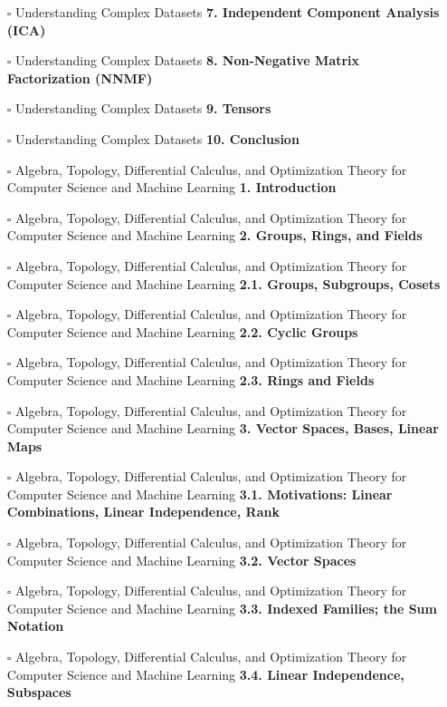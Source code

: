 \documentclass[a4, landscape, 12pt]{article}
\newcommand{\checkbox}{$\square$}%
\begin{document}
\begin{itemize}
{}
\item [\checkbox]  Understanding Complex Datasets \textbf{ 7. Independent Component Analysis (ICA)
}
\item [\checkbox]  Understanding Complex Datasets \textbf{ 8. Non-Negative Matrix Factorization (NNMF)
}
\item [\checkbox]  Understanding Complex Datasets \textbf{ 9. Tensors
}
\item [\checkbox]  Understanding Complex Datasets \textbf{ 10. Conclusion
}
\item [\checkbox]  Algebra, Topology, Differential Calculus, and Optimization Theory for Computer Science and Machine Learning \textbf{ 1. Introduction
}
\item [\checkbox]  Algebra, Topology, Differential Calculus, and Optimization Theory for Computer Science and Machine Learning \textbf{ 2. Groups, Rings, and Fields
}
\item [\checkbox]  Algebra, Topology, Differential Calculus, and Optimization Theory for Computer Science and Machine Learning \textbf{ 2.1. Groups, Subgroups, Cosets
}
\item [\checkbox]  Algebra, Topology, Differential Calculus, and Optimization Theory for Computer Science and Machine Learning \textbf{ 2.2. Cyclic Groups
}
\item [\checkbox]  Algebra, Topology, Differential Calculus, and Optimization Theory for Computer Science and Machine Learning \textbf{ 2.3. Rings and Fields
}
\item [\checkbox]  Algebra, Topology, Differential Calculus, and Optimization Theory for Computer Science and Machine Learning \textbf{ 3. Vector Spaces, Bases, Linear Maps
}
\item [\checkbox]  Algebra, Topology, Differential Calculus, and Optimization Theory for Computer Science and Machine Learning \textbf{ 3.1. Motivations: Linear Combinations, Linear Independence, Rank
}
\item [\checkbox]  Algebra, Topology, Differential Calculus, and Optimization Theory for Computer Science and Machine Learning \textbf{ 3.2. Vector Spaces
}
\item [\checkbox]  Algebra, Topology, Differential Calculus, and Optimization Theory for Computer Science and Machine Learning \textbf{ 3.3. Indexed Families; the Sum Notation
}
\item [\checkbox]  Algebra, Topology, Differential Calculus, and Optimization Theory for Computer Science and Machine Learning \textbf{ 3.4. Linear Independence, Subspaces
}
\end{itemize}
\end{document}
